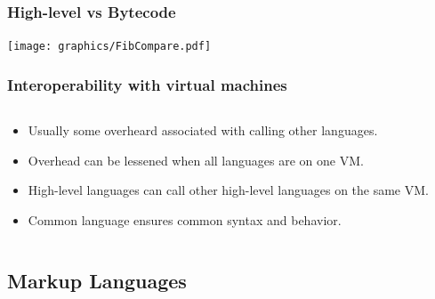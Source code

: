 \documentclass{beamer}
\begin{document}
\begin{frame}
  \frametitle{High-level vs Bytecode}
  \texttt{[image: graphics/FibCompare.pdf]}
\end{frame}

\begin{frame}
 \frametitle{Interoperability with virtual machines}
 \begin{columns}
 \begin{column}{0.5\textwidth}
 \begin{itemize}
 \item Usually some overheard associated with calling other languages.
 \item Overhead can be lessened when all languages are on one VM.
 \item High-level languages can call other high-level languages on the same VM.
 \item Common language ensures common syntax and behavior.
 \end{itemize}
 \end{column}
 
 \begin{column}{0.5\textwidth}
 \end{column}
 \end{columns}
\end{frame}

\subsection{Markup Languages}
\end{document}
